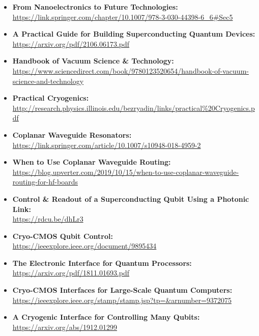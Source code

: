 \begin{itemize}
  \item\textbf{From Nanoelectronics to Future Technologies:}\\
\url{https://link.springer.com/chapter/10.1007/978-3-030-44398-6_6#Sec5}

  \item\textbf{A Practical Guide for Building Superconducting Quantum Devices:}\\
\url{https://arxiv.org/pdf/2106.06173.pdf}

  \item\textbf{Handbook of Vacuum Science \& Technology:}\\
\url{https://www.sciencedirect.com/book/9780123520654/handbook-of-vacuum-science-and-technology}

  \item\textbf{Practical Cryogenics:}\\
\url{http://research.physics.illinois.edu/bezryadin/links/practical%20Cryogenics.pdf}

  \item\textbf{Coplanar Waveguide Resonators:}\\
\url{https://link.springer.com/article/10.1007/s10948-018-4959-2}

  \item\textbf{When to Use Coplanar Waveguide Routing:}\\
\url{https://blog.upverter.com/2019/10/15/when-to-use-coplanar-waveguide-routing-for-hf-boards}

  \item\textbf{Control \& Readout of a Superconducting Qubit Using a Photonic Link:}\\
\url{https://rdcu.be/dhLr3}

  \item\textbf{Cryo-CMOS Qubit Control:}\\
\url{https://ieeexplore.ieee.org/document/9895434}

  \item\textbf{The Electronic Interface for Quantum Processors:}\\
\url{https://arxiv.org/pdf/1811.01693.pdf}

  \item\textbf{Cryo-CMOS Interfaces for Large-Scale Quantum Computers:}\\
\url{https://ieeexplore.ieee.org/stamp/stamp.jsp?tp=&arnumber=9372075}

  \item\textbf{A Cryogenic Interface for Controlling Many Qubits:}\\
\url{https://arxiv.org/abs/1912.01299}


\end{itemize}
